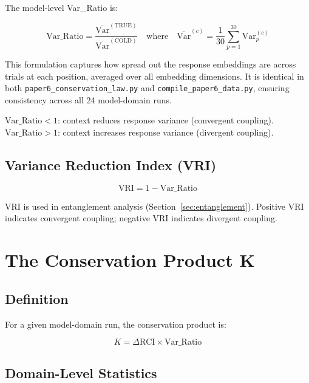 \documentclass[11pt,a4paper]{article}
\begin{document}
The model-level Var\_Ratio is:

\begin{equation}
    \text{Var\_Ratio} = \frac{\overline{\text{Var}}^{(\text{TRUE})}}
    {\overline{\text{Var}}^{(\text{COLD})}}
    \quad \text{where} \quad
    \overline{\text{Var}}^{(c)} = \frac{1}{30} \sum_{p=1}^{30} \text{Var}_{p}^{(c)}
\end{equation}

This formulation captures how spread out the response embeddings are across trials
at each position, averaged over all embedding dimensions. It is identical in both
\texttt{paper6\_conservation\_law.py} and \texttt{compile\_paper6\_data.py},
ensuring consistency across all 24 model-domain runs.

$\text{Var\_Ratio} < 1$: context reduces response variance (convergent coupling).\\
$\text{Var\_Ratio} > 1$: context increases response variance (divergent coupling).

\subsection{Variance Reduction Index (VRI)}

\begin{equation}
    \text{VRI} = 1 - \text{Var\_Ratio}
\end{equation}

VRI is used in entanglement analysis (Section~\ref{sec:entanglement}). Positive VRI
indicates convergent coupling; negative VRI indicates divergent coupling.

\section{The Conservation Product K}

\subsection{Definition}

For a given model-domain run, the conservation product is:

\begin{equation}
    K = \Delta\text{RCI} \times \text{Var\_Ratio}
\end{equation}

\subsection{Domain-Level Statistics}
\end{document}
